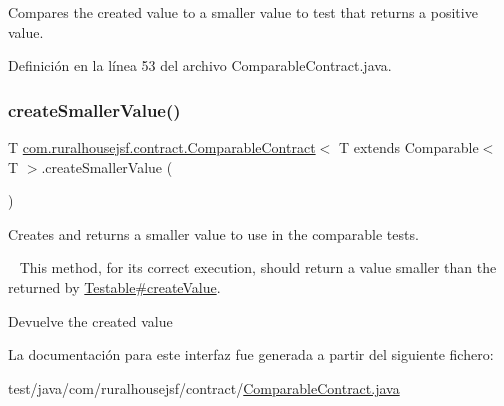 Compares the created value to a smaller value to test that returns a positive value. 



Definición en la línea 53 del archivo Comparable\+Contract.\+java.

\mbox{\label{interfacecom_1_1ruralhousejsf_1_1contract_1_1_comparable_contract_a63e1e8c46f202f132c7f15b51a11ee27}} 
\subsubsection{\texorpdfstring{createSmallerValue()}{createSmallerValue()}}
{\footnotesize\ttfamily T \mbox{\hyperlink{interfacecom_1_1ruralhousejsf_1_1contract_1_1_comparable_contract}{com.\+ruralhousejsf.\+contract.\+Comparable\+Contract}}$<$ T extends Comparable$<$ T $>$.create\+Smaller\+Value (\begin{DoxyParamCaption}{ }\end{DoxyParamCaption})}



Creates and returns a smaller value to use in the comparable tests. 

~\newline
 This method, for its correct execution, should return a value smaller than the returned by \mbox{\hyperlink{interfacecom_1_1ruralhousejsf_1_1contract_1_1_testable_ae4546a381488faaba1ef7c0f8688de9c}{Testable\#create\+Value}}.

\begin{DoxyReturn}{Devuelve}
the created value 
\end{DoxyReturn}


La documentación para este interfaz fue generada a partir del siguiente fichero\+:\begin{DoxyCompactItemize}
\item 
test/java/com/ruralhousejsf/contract/\mbox{\hyperlink{_comparable_contract_8java}{Comparable\+Contract.\+java}}\end{DoxyCompactItemize}
